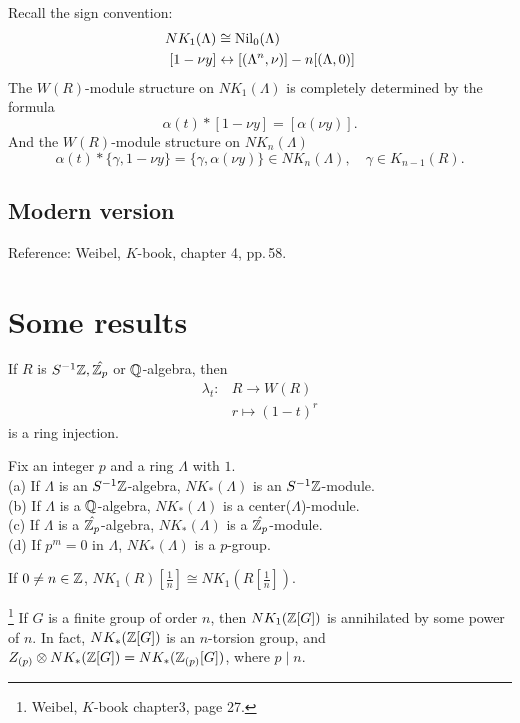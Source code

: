 Recall the sign convention:
\begin{align*}
	NK_1(\Lambda) & \cong \mathrm{Nil}_0(\Lambda)\\
[1-\nu y] & \leftrightarrow [(\Lambda^n,\nu)]-n[(\Lambda,0)]
\end{align*}
The $W(R)$-module structure on $NK_1(\Lambda)$ is completely determined by the formula
\[\alpha(t) * [1-\nu y]=[\alpha(\nu y)].\]
And the $W(R)$-module structure on $NK_n(\Lambda)$ 
\[\alpha(t) * \{\gamma,1-\nu y\}=\{\gamma,\alpha(\nu y)\} \in NK_n(\Lambda), \quad \gamma\in K_{n-1}(R).\]
%
%
\subsection{Modern version}
Reference: Weibel, $K$-book, chapter 4, pp.\,58.

\section{Some results} %
\label{sec:some_results}
\begin{prop}
	If $R$ is $S^{-1}\mathbb{Z},\hat{\mathbb{Z}_p}$ or $\mathbb{Q}$-algebra, then
	\begin{align*}
		\lambda_t \colon& R\longrightarrow W(R)\\
		& r\mapsto (1-t)^r
	\end{align*}
	is a ring injection.
\end{prop}
\begin{corollary}
	Fix an integer $p$ and a ring $\Lambda$ with $1$.\\
(a) If $\Lambda$ is an $S^{-1}\mathbb{Z}$-algebra, $NK_*(\Lambda)$ is an $S^{-1}\mathbb{Z}$-module.\\
(b) If $\Lambda$ is a $\mathbb{Q}$-algebra, $NK_*(\Lambda)$ is a  center($\Lambda$)-module.\\
(c) If $\Lambda$ is a $\hat{\mathbb{Z}_p}$-algebra, $NK_*(\Lambda)$ is a $\hat{\mathbb{Z}_p}$-module.\\
(d) If $p^m=0$ in $\Lambda$, $NK_*(\Lambda)$ is a $p$-group.
\end{corollary}
\begin{theorem}[Stienstra]
	If $0\neq n\in \mathbb{Z}$, $NK_1(R)[\frac{1}{n}]\cong NK_1(R[\frac{1}{n}])$.
\end{theorem}
\begin{corollary}\footnote{Weibel, $K$-book chapter3, page 27.}
	If $G$ is a finite group of order $n$, then $NK_1(\mathbb{Z}[G])$ is annihilated by some power of $n$. In fact, $NK_*(\mathbb{Z}[G])$ is an $n$-torsion group, and $Z_{(p)}\otimes NK_*(\mathbb{Z}[G])=NK_*(\mathbb{Z}_{(p)}[G])$, where $p\mid n$.
\end{corollary}
